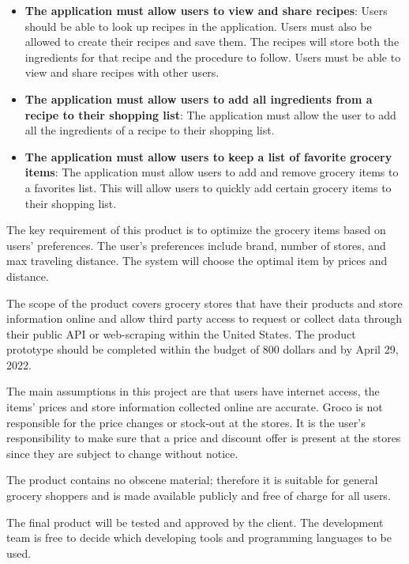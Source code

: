 \begin{itemize}
\item \textbf{The application must allow users to view and share recipes}: Users should be able to look up recipes in the application. Users must also be allowed to create their recipes and save them. The recipes will store both the ingredients for that recipe and the procedure to follow. Users must be able to view and share recipes with other users.

\item \textbf{The application must allow users to add all ingredients from a recipe to their shopping list}: The application must allow the user to add all the ingredients of a recipe to their shopping list.

\item \textbf{The application must allow users to keep a list of favorite grocery items}: The application must allow users to add and remove grocery items to a favorites list. This will allow users to quickly add certain grocery items to their shopping list.

\end{itemize} 

The key requirement of this product is to optimize the grocery items based on users' preferences. The user's preferences include brand, number of stores, and max traveling distance. The system will choose the optimal item by prices and distance.  

The scope of the product covers grocery stores that have their products and store information online and allow third party access to request or collect data through their public API or web-scraping within the United States. The product prototype should be completed within the budget of 800 dollars and by April 29, 2022.

The main assumptions in this project are that users have internet access, the items' prices and store information collected online are accurate. Groco is not responsible for the price changes or stock-out at the stores. It is the user's responsibility to make sure that a price and discount offer is present at the stores since they are subject to change without notice.

The product contains no obscene material; therefore it is suitable for general grocery shoppers and is made available publicly and free of charge for all users.

The final product will be tested and approved by the client. The development team is free to decide which developing tools and programming languages to be used.

